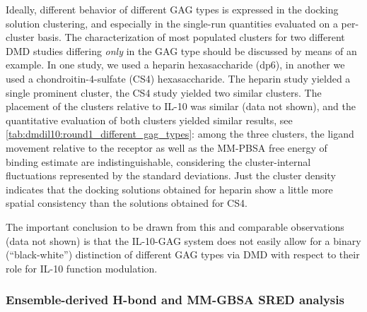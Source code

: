 Ideally, different behavior of different GAG types is expressed in the docking
solution clustering, and especially in the single-run quantities evaluated on a
per-cluster basis. The characterization of most populated clusters for two
different DMD studies differing \textit{only} in the GAG type should be
discussed by means of an example. In one study, we used a heparin hexasaccharide
(dp6), in another we used a chondroitin-4-sulfate (CS4) hexasaccharide. The
heparin study yielded a single prominent cluster, the CS4 study yielded two
similar clusters. The placement of the clusters relative to IL-10 was similar
(data not shown), and the quantitative evaluation of both clusters yielded
similar results, see \cref{tab:dmdil10:round1_different_gag_types}: among the
three clusters, the ligand movement relative to the receptor as well as the
MM-PBSA free energy of binding estimate are indistinguishable, considering the
cluster-internal fluctuations represented by the standard deviations. Just the
cluster density indicates that the docking solutions obtained for heparin show a
little more spatial consistency than the solutions obtained for CS4.

The important conclusion to be drawn from this and comparable observations (data
not shown) is that the IL-10-GAG system does not easily allow for a binary
(\enquote{black-white}) distinction of different GAG types via DMD with respect
to their role for IL-10 function modulation.


\subsubsection{Ensemble-derived H-bond and MM-GBSA SRED analysis}

